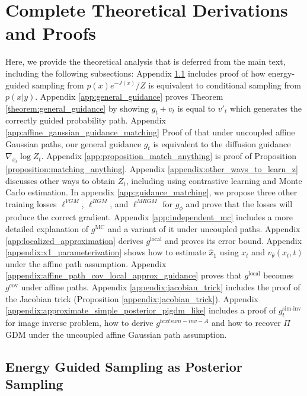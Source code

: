 



\section{Complete Theoretical Derivations and Proofs}

Here, we provide the theoretical analysis that is deferred from the main text, including the following subsections:
Appendix \ref{app:posterior_sampling_and_energy_guided_sampling} includes proof of how energy-guided sampling from $p(x)e^{-J(x)} / Z$ is equivalent to conditional sampling from $p(x|y)$.
Appendix \ref{app:general_guidance} proves Theorem \ref{theorem:general_guidance} by showing $g_t+v_t$ is equal to $v'_t$ which generates the correctly guided probability path.
Appendix \ref{app:affine_gaussian_guidance_matching} Proof of that under uncoupled affine Gaussian paths, our general guidance $g_t$ is equivalent to the diffusion guidance $\nabla_{x_t} \log Z_t$.
Appendix \ref{app:proposition_match_anything} is proof of Proposition \ref{proposition:matching_anything}.
Appendix \ref{appendix:other_ways_to_learn_z} discusses other ways to obtain $Z_t$, including using contrastive learning and Monte Carlo estimation.
In appendix \ref{app:guidance_matching}, we propose three other training losses $\ell^{VGM}$, $\ell^{RGM}$, and $\ell^{MRGM}$ for $g_\phi$ and prove that the losses will produce the correct gradient.
Appendix \ref{app:independent_mc} includes a more detailed explanation of $g^{\text{MC}}$ and a variant of it under uncoupled paths.
Appendix \ref{app:localized_approximation} derives $g^{\text{local}}$ and proves its error bound.
Appendix \ref{appendix:x1_parameterization} shows how to estimate $\hat{x}_1$ using $x_t$ and $v_\theta(x_t,t)$ under the affine path assumption.
Appendix \ref{appendix:affine_path_cov_local_approx_guidance} proves that $g^{\text{local}}$ becomes $g^{\text{cov}}$ under affine paths.
Appendix \ref{appendix:jacobian_trick} includes the proof of the Jacobian trick (Proposition \ref{appendix:jacobian_trick}).
Appendix \ref{appendix:approximate_simple_posterior_pigdm_like} includes a proof of $g_t^{\text{sim-inv}}$ for image inverse problem, how to derive $g^{text{sum-inv-A}}$ and how to recover $\Pi$GDM under the uncoupled affine Gaussian path assumption.


\subsection{Energy Guided Sampling as Posterior Sampling}
\label{app:posterior_sampling_and_energy_guided_sampling}

